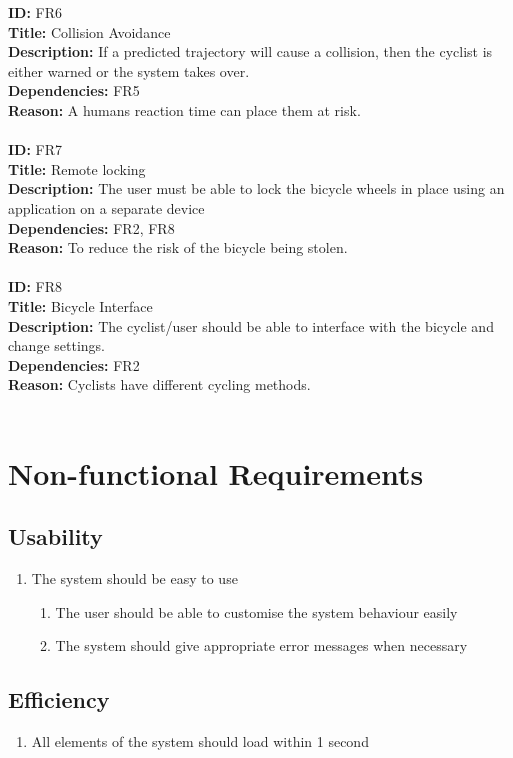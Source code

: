 \documentclass[a4paper]{report}
\begin{document}
\textbf{ID:} FR6\\
\textbf{Title:}  Collision Avoidance\\
\textbf{Description:} If a predicted trajectory will cause a collision, then the cyclist is either warned or the system takes over.\\
\textbf{Dependencies:} FR5\\
\textbf{Reason:} A humans reaction time can place them at risk.\\\\
\textbf{ID:} FR7\\
\textbf{Title:}  Remote locking\\
\textbf{Description:} The user must be able to lock the bicycle wheels in place using an application on a separate device\\
\textbf{Dependencies:} FR2, FR8\\
\textbf{Reason:} To reduce the risk of the bicycle being stolen.\\\\
\textbf{ID:} FR8\\
\textbf{Title:}  Bicycle Interface\\
\textbf{Description:} The cyclist/user should be able to interface with the bicycle and change settings.\\
\textbf{Dependencies:} FR2\\
\textbf{Reason:} Cyclists have different cycling methods.\\\\

\section{Non-functional Requirements}
\subsection{Usability}
\label{usability}
\begin{enumerate}[label=\ref*{usability}.\arabic*.,leftmargin=*]
\item The system should be easy to use
\begin{enumerate}[label*=\arabic*.]
\item The user should be able to customise the system behaviour easily
\item The system should give appropriate error messages when necessary
\end{enumerate}
\end{enumerate}
\subsection{Efficiency}
\label{efficiency}
\begin{enumerate}[label=\ref*{efficiency}.\arabic*.,leftmargin=*]
\item All elements of the system should load within 1 second
\end{enumerate}
\end{document}
